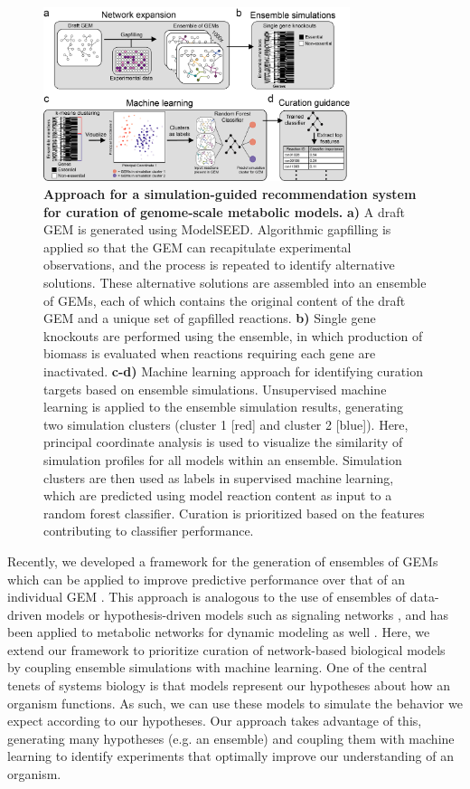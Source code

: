\documentclass[11pt,twocolumn,notitlepage,openany,twoside]{book}
\begin{document}
\begin{refsection}
\begin{figure}[tb]
\centering
\includegraphics[width=0.8\textwidth]{ch3_fig1}
\caption[ Approach for a simulation-guided recommendation system for curation of genome-scale metabolic models.]{\textbf{ Approach for a simulation-guided recommendation system for curation of genome-scale metabolic models.} \textbf{a)} A draft GEM is generated using ModelSEED. Algorithmic gapfilling is applied so that the GEM can recapitulate experimental observations, and the process is repeated to identify alternative solutions. These alternative solutions are assembled into an ensemble of GEMs, each of which contains the original content of the draft GEM and a unique set of gapfilled reactions. \textbf{b)} Single gene knockouts are performed using the ensemble, in which production of biomass is evaluated when reactions requiring each gene are inactivated. \textbf{c-d)} Machine learning approach for identifying curation targets based on ensemble simulations. Unsupervised machine learning is applied to the ensemble simulation results, generating two simulation clusters (cluster 1 [red] and cluster 2 [blue]). Here, principal coordinate analysis is used to visualize the similarity of simulation profiles for all models within an ensemble. Simulation clusters are then used as labels in supervised machine learning, which are predicted using model reaction content as input to a random forest classifier. Curation is prioritized based on the features contributing to classifier performance.}
\end{figure}

Recently, we developed a framework for the generation of ensembles of GEMs which can be applied to improve predictive performance over that of an individual GEM \cite{Biggs2017-md}. This approach is analogous to the use of ensembles of data-driven models \cite{Dietterich2000-dq} or hypothesis-driven models such as signaling networks \cite{Kuepfer2007-gq}, and has been applied to metabolic networks for dynamic modeling as well \cite{Tran2008-pt}. Here, we extend our framework to prioritize curation of network-based biological models by coupling ensemble simulations with machine learning. One of the central tenets of systems biology is that models represent our hypotheses about how an organism functions. As such, we can use these models to simulate the behavior we expect according to our hypotheses. Our approach takes advantage of this, generating many hypotheses (e.g. an ensemble) and coupling them with machine learning to identify experiments that optimally improve our understanding of an organism.


\end{refsection}
\end{document}
